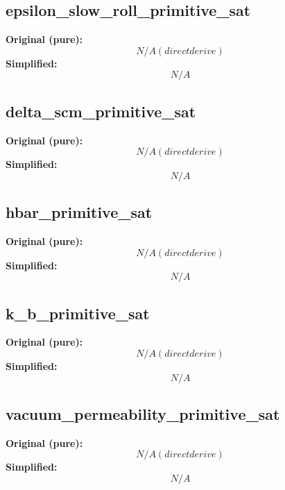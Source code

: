 \subsection{epsilon_slow_roll_primitive_sat}
\textbf{Original (pure):}
\begin{equation}
N/A (direct derive)
\end{equation}
\textbf{Simplified:}
\begin{equation}
N/A
\end{equation}

\subsection{delta_scm_primitive_sat}
\textbf{Original (pure):}
\begin{equation}
N/A (direct derive)
\end{equation}
\textbf{Simplified:}
\begin{equation}
N/A
\end{equation}

\subsection{hbar_primitive_sat}
\textbf{Original (pure):}
\begin{equation}
N/A (direct derive)
\end{equation}
\textbf{Simplified:}
\begin{equation}
N/A
\end{equation}

\subsection{k_b_primitive_sat}
\textbf{Original (pure):}
\begin{equation}
N/A (direct derive)
\end{equation}
\textbf{Simplified:}
\begin{equation}
N/A
\end{equation}

\subsection{vacuum_permeability_primitive_sat}
\textbf{Original (pure):}
\begin{equation}
N/A (direct derive)
\end{equation}
\textbf{Simplified:}
\begin{equation}
N/A
\end{equation}

